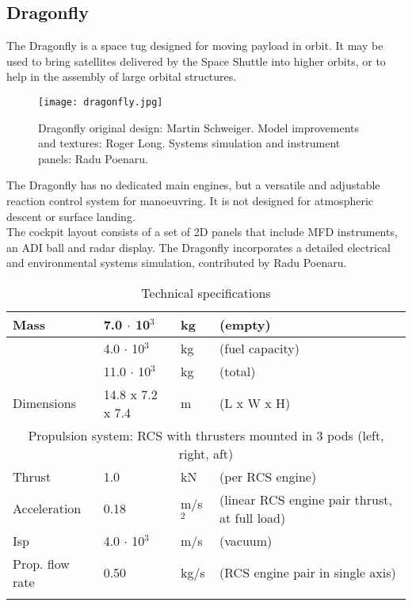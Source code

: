 \documentclass[Orbiter User Manual.tex]{subfiles}
\begin{document}
\subsection{Dragonfly}
The Dragonfly is a space tug designed for moving payload in orbit. It may be used to bring satellites delivered by the Space Shuttle into higher orbits, or to help in the assembly of large orbital structures.

\begin{figure}[H]
  \centering
  \texttt{[image: dragonfly.jpg]}
  \caption{Dragonfly original design: Martin Schweiger. Model improvements and textures: Roger Long. Systems simulation and instrument panels: Radu Poenaru.}
\end{figure}

\noindent
The Dragonfly has no dedicated main engines, but a versatile and adjustable reaction control system for manoeuvring. It is not designed for atmospheric descent or surface landing.\\
The cockpit layout consists of a set of 2D panels that include MFD instruments, an ADI ball and radar display. The Dragonfly incorporates a detailed electrical and environmental systems simulation, contributed by Radu Poenaru.

	\begin{longtable}{ |p{}|p{}|p{}|p{}| }
	\hline\rule{0pt}{2ex}
	Mass & 7.0 $\cdot$ 10$^{3}$ & kg & (empty)\\
	\hline\rule{0pt}{2ex}
	& 4.0 $\cdot$ 10$^{3}$ & kg & (fuel capacity)\\
	\hline\rule{0pt}{2ex}
	& 11.0 $\cdot$ 10$^{3}$ & kg & (total)\\
	\hline\rule{0pt}{2ex}
	Dimensions & 14.8 x 7.2 x 7.4 & m & (L x W x H)\\
	\hline
	\multicolumn{4}{|c|}{\rule{0pt}{2ex}Propulsion system: RCS with thrusters mounted in 3 pods (left, right, aft)}\\
	\hline\rule{0pt}{2ex}
	Thrust & 1.0 & kN & (per RCS engine)\\
	\hline\rule{0pt}{2ex}
	Acceleration & 0.18 & m/s$^{2}$ & (linear RCS engine pair thrust, at full load)\\
	\hline\rule{0pt}{2ex}
	Isp & 4.0 $\cdot$ 10$^{3}$ & m/s & (vacuum)\\
	\hline\rule{0pt}{2ex}
	Prop. flow rate & 0.50 & kg/s & (RCS engine pair in single axis)\\
	\hline
	\caption{Technical specifications}
	\end{longtable}
\end{document}
